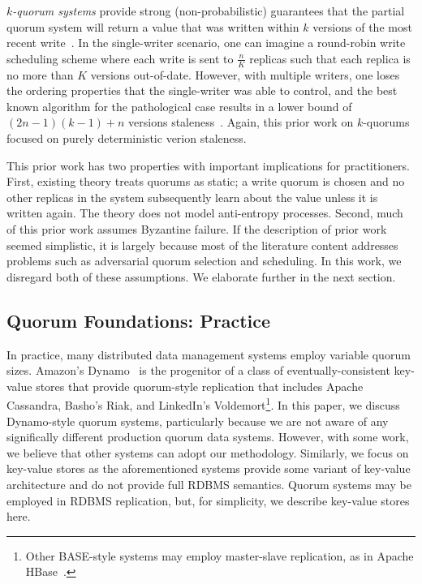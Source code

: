 \documentclass{vldb}
\begin{document}
\textit{$k$-quorum systems} provide strong (non-probabilistic)
guarantees that the partial quorum system will return a value that was
written within $k$ versions of the most recent
write~\cite{nonstrict-availability}.  In the single-writer scenario,
one can imagine a round-robin write scheduling scheme where each write
is sent to $\frac{n}{K}$ replicas such that each replica is no more
than $K$ versions out-of-date.  However, with multiple writers, one
loses the ordering properties that the single-writer was able to
control, and the best known algorithm for the pathological case
results in a lower bound of $(2n-1)(k-1)+n$ versions staleness~\cite{k-quorum-lb}.
Again, this prior work on $k$-quorums focused on purely deterministic
verion staleness.

This prior work has two properties with important implications for
practitioners.  First, existing theory treats quorums as static; a
write quorum is chosen and no other replicas in the system
subsequently learn about the value unless it is written again.  The
theory does not model anti-entropy processes.  Second, much of this
prior work assumes Byzantine failure.  If the description of prior
work seemed simplistic, it is largely because most of the literature
content addresses problems such as adversarial quorum selection and
scheduling.  In this work, we disregard both of these assumptions.  We
elaborate further in the next section.

\subsection{Quorum Foundations: Practice}
\label{sec:practice}

In practice, many distributed data management systems employ variable
quorum sizes. Amazon's Dynamo~\cite{dynamo} is the progenitor of a
class of eventually-consistent key-value stores that provide
quorum-style replication that includes Apache Cassandra, Basho's Riak,
and LinkedIn's Voldemort\footnote{Other BASE-style systems may employ
  master-slave replication, as in Apache HBase~\cite{hbase}.}.  In
this paper, we discuss Dynamo-style quorum systems, particularly
because we are not aware of any significally different production
quorum data systems.  However, with some work, we believe that other
systems can adopt our methodology.  Similarly, we focus on key-value
stores as the aforementioned systems provide some variant of key-value
architecture and do not provide full RDBMS semantics.  Quorum systems
may be employed in RDBMS replication, but, for simplicity, we describe
key-value stores here.
\end{document}
